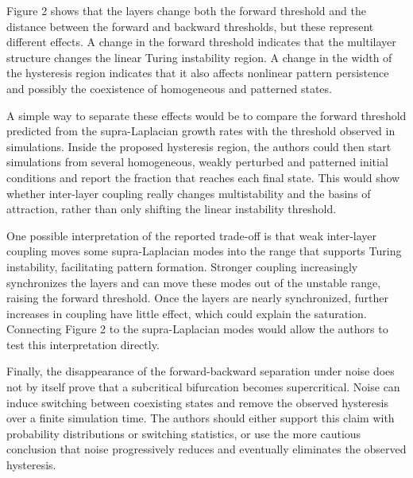 \documentclass[a4paper,12pt]{article}
\begin{document}
\newpage
\begin{tcolorbox}[title = {Comment 5 Turing instability, hysteresis and multistability},fonttitle = \bfseries]
    Figure 2 shows that the layers change both the forward threshold and the distance between the forward and backward thresholds, but these represent different effects. A change in the forward threshold indicates that the multilayer structure changes the linear Turing instability region. A change in the width of the hysteresis region indicates that it also affects nonlinear pattern persistence and possibly the coexistence of homogeneous and patterned states.

    \medskip

    A simple way to separate these effects would be to compare the forward threshold predicted from the supra-Laplacian growth rates with the threshold observed in simulations. Inside the proposed hysteresis region, the authors could then start simulations from several homogeneous, weakly perturbed and patterned initial conditions and report the fraction that reaches each final state. This would show whether inter-layer coupling really changes multistability and the basins of attraction, rather than only shifting the linear instability threshold.

    \medskip

    One possible interpretation of the reported trade-off is that weak inter-layer coupling moves some supra-Laplacian modes into the range that supports Turing instability, facilitating pattern formation. Stronger coupling increasingly synchronizes the layers and can move these modes out of the unstable range, raising the forward threshold. Once the layers are nearly synchronized, further increases in coupling have little effect, which could explain the saturation. Connecting Figure 2 to the supra-Laplacian modes would allow the authors to test this interpretation directly.

    \medskip

    Finally, the disappearance of the forward-backward separation under noise does not by itself prove that a subcritical bifurcation becomes supercritical. Noise can induce switching between coexisting states and remove the observed hysteresis over a finite simulation time. The authors should either support this claim with probability distributions or switching statistics, or use the more cautious conclusion that noise progressively reduces and eventually eliminates the observed hysteresis.

    \medskip


\end{tcolorbox}
\end{document}
